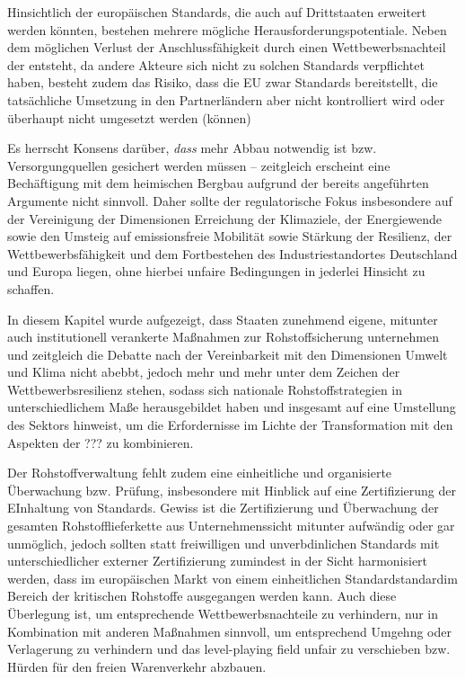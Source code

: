 \documentclass[12pt,a4paper,oneside]{book} %
\begin{document}
{Hinsichtlich der europäischen Standards, die auch auf Drittstaaten erweitert werden könnten, bestehen mehrere mögliche Herausforderungspotentiale. Neben dem möglichen Verlust der Anschlussfähigkeit durch einen Wettbewerbsnachteil der entsteht, da andere Akteure sich nicht zu solchen Standards verpflichtet haben, besteht zudem das Risiko, dass die EU zwar Standards bereitstellt, die tatsächliche Umsetzung in den Partnerländern aber nicht kontrolliert wird oder überhaupt nicht umgesetzt werden (können)

Es herrscht Konsens darüber, \textit{dass} mehr Abbau notwendig ist bzw. Versorgungquellen gesichert werden müssen -- zeitgleich erscheint eine Bechäftigung mit dem heimischen Bergbau aufgrund der bereits angeführten Argumente nicht sinnvoll. Daher sollte der regulatorische Fokus insbesondere auf der Vereinigung der Dimensionen Erreichung der Klimaziele, der Energiewende sowie den Umsteig auf emissionsfreie Mobilität sowie Stärkung der Resilienz, der Wettbewerbsfähigkeit und dem Fortbestehen des Industriestandortes Deutschland und Europa liegen, ohne hierbei unfaire Bedingungen in jederlei Hinsicht zu schaffen. 

In diesem Kapitel wurde aufgezeigt, dass Staaten zunehmend eigene, mitunter auch institutionell verankerte Maßnahmen zur Rohstoffsicherung unternehmen und zeitgleich die Debatte nach der Vereinbarkeit mit den Dimensionen Umwelt und Klima nicht abebbt, jedoch mehr und mehr unter dem Zeichen der Wettbewerbsresilienz stehen, sodass sich nationale Rohstoffstrategien in unterschiedlichem Maße herausgebildet haben und insgesamt auf eine Umstellung des Sektors hinweist, um die Erfordernisse im Lichte der Transformation mit den Aspekten der ??? zu kombinieren.

Der Rohstoffverwaltung fehlt zudem eine einheitliche und organisierte Überwachung bzw. Prüfung, insbesondere mit Hinblick auf eine Zertifizierung der EInhaltung von Standards. Gewiss ist die  Zertifizierung und Überwachung der gesamten Rohstofflieferkette aus Unternehmenssicht mitunter aufwändig oder gar unmöglich, jedoch sollten statt freiwilligen und unverbdinlichen Standards mit unterschiedlicher externer Zertifizierung zumindest in der Sicht harmonisiert werden, dass im europäischen Markt von einem einheitlichen \glqq Standardstandard\grqq im Bereich der kritischen Rohstoffe ausgegangen werden kann. Auch diese Überlegung ist, um entsprechende Wettbewerbsnachteile zu verhindern, nur in Kombination mit anderen Maßnahmen sinnvoll, um entsprechend Umgehng oder Verlagerung zu verhindern und das level-playing field unfair zu verschieben bzw. Hürden für den freien Warenverkehr abzbauen.

}
\end{document}
